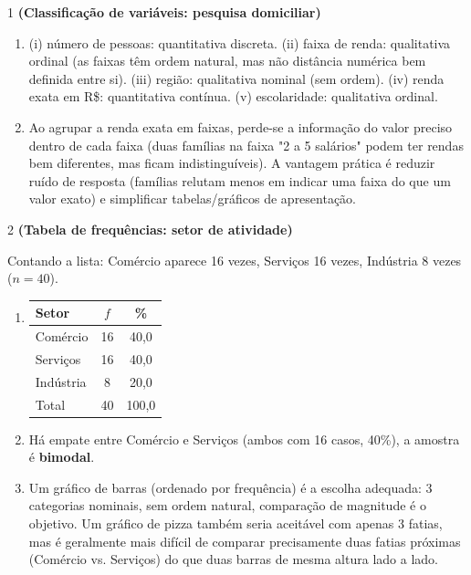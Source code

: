 \documentclass[11pt]{article}
\begin{document}

\begin{questao}{1} \textbf{(Classificação de variáveis: pesquisa domiciliar)}
\begin{solucao}
\begin{enumerate}[label=(\alph*)]
  \item (i) número de pessoas: quantitativa discreta. (ii) faixa de renda: qualitativa ordinal
    (as faixas têm ordem natural, mas não distância numérica bem definida entre si). (iii) região:
    qualitativa nominal (sem ordem). (iv) renda exata em R\$: quantitativa contínua. (v)
    escolaridade: qualitativa ordinal.
  \item Ao agrupar a renda exata em faixas, perde-se a informação do valor preciso dentro de cada
    faixa (duas famílias na faixa "2 a 5 salários" podem ter rendas bem diferentes, mas ficam
    indistinguíveis). A vantagem prática é reduzir ruído de resposta (famílias relutam menos em
    indicar uma faixa do que um valor exato) e simplificar tabelas/gráficos de apresentação.
\end{enumerate}
\end{solucao}
\end{questao}

\begin{questao}{2} \textbf{(Tabela de frequências: setor de atividade)}
\begin{solucao}
Contando a lista: Comércio aparece 16 vezes, Serviços 16 vezes, Indústria 8 vezes ($n=40$).

\begin{enumerate}[label=(\alph*)]
  \item
  \begin{center}
  \begin{tabular}{lcc}
  \toprule
  Setor & $f$ & \% \\
  \midrule
  Comércio  & 16 & 40,0 \\
  Serviços  & 16 & 40,0 \\
  Indústria & 8  & 20,0 \\
  \midrule
  Total     & 40 & 100,0 \\
  \bottomrule
  \end{tabular}
  \end{center}
  \item Há empate entre Comércio e Serviços (ambos com 16 casos, 40\%), a amostra é
    \textbf{bimodal}.
  \item Um gráfico de barras (ordenado por frequência) é a escolha adequada: 3 categorias
    nominais, sem ordem natural, comparação de magnitude é o objetivo. Um gráfico de pizza
    também seria aceitável com apenas 3 fatias, mas é geralmente mais difícil de comparar
    precisamente duas fatias próximas (Comércio vs. Serviços) do que duas barras de mesma altura
    lado a lado.
\end{enumerate}
\end{solucao}
\end{questao}
\end{document}
